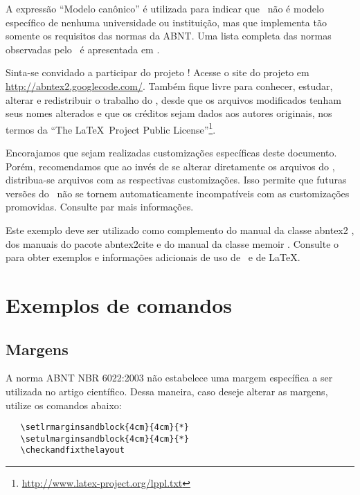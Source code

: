 \documentclass[
	article,			%
	11pt,				%
	oneside,			%
	a4paper,			%
	english,			%
	brazil,				%
	]{abntex2}
\begin{document}
A expressão ``Modelo canônico'' é utilizada para indicar que \abnTeX\ não é
modelo específico de nenhuma universidade ou instituição, mas que implementa tão
somente os requisitos das normas da ABNT. Uma lista completa das normas
observadas pelo \abnTeX\ é apresentada em .

Sinta-se convidado a participar do projeto \abnTeX! Acesse o site do projeto em
\url{http://abntex2.googlecode.com/}. Também fique livre para conhecer,
estudar, alterar e redistribuir o trabalho do \abnTeX, desde que os arquivos
modificados tenham seus nomes alterados e que os créditos sejam dados aos
autores originais, nos termos da ``The \LaTeX\ Project Public
License''\footnote{\url{http://www.latex-project.org/lppl.txt}}.

Encorajamos que sejam realizadas customizações específicas deste documento.
Porém, recomendamos que ao invés de se alterar diretamente os arquivos do
\abnTeX, distribua-se arquivos com as respectivas customizações. Isso permite
que futuras versões do \abnTeX~não se tornem automaticamente incompatíveis com
as customizações promovidas. Consulte 
par mais informações.

Este exemplo deve ser utilizado como complemento do manual da classe
\textsf{abntex2} \cite{abntex2classe}, dos manuais do pacote
\textsf{abntex2cite} \cite{abntex2cite,abntex2cite-alf} e do manual da classe
\textsf{memoir} \cite{memoir}. Consulte o  para obter
exemplos e informações adicionais de uso de \abnTeX\ e de \LaTeX.

\section{Exemplos de comandos}

\subsection{Margens}

A norma ABNT NBR 6022:2003 não estabelece uma margem específica a ser utilizada
no artigo científico. Dessa maneira, caso deseje alterar as margens, utilize os
comandos abaixo:

\begin{verbatim}
   \setlrmarginsandblock{4cm}{4cm}{*}
   \setulmarginsandblock{4cm}{4cm}{*}
   \checkandfixthelayout
\end{verbatim}
\end{document}
